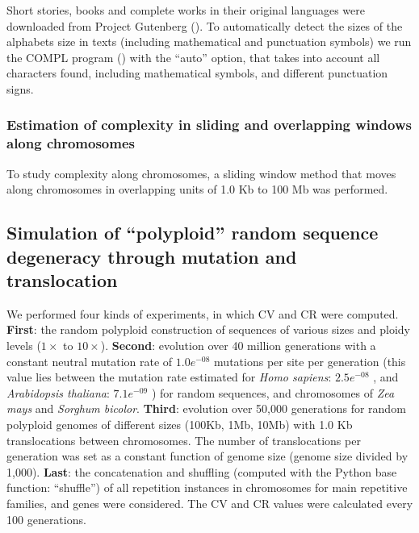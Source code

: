 Short stories, books and complete works in their original languages were downloaded from Project Gutenberg (). To automatically detect the sizes of the alphabets size in texts (including mathematical and punctuation symbols) we run the COMPL program () with the ``auto'' option, that takes into account all characters found, including mathematical symbols, and different punctuation signs. 


\subsubsection{Estimation of complexity in sliding and overlapping windows along chromosomes}
\label{sec:complexity-windows}

To study complexity along chromosomes, a sliding window method that moves along chromosomes in overlapping units of 1.0 Kb to 100 Mb was performed.

\subsection{Simulation of ``polyploid'' random sequence degeneracy through mutation and translocation}
\label{sec:simulations}

We performed four kinds of experiments, in which CV and CR were computed. \textbf{First}: the random polyploid construction of sequences of various sizes and ploidy levels ($1\times$ to $10\times$). \textbf{Second}: evolution over 40 million generations with a constant neutral mutation rate of $1.0e^{-08}$ mutations per site per generation (this value lies between the mutation rate estimated for {\it Homo sapiens}: $2.5e^{-08}$ \cite{Nachman2000} , and \textit{Arabidopsis thaliana}: $7.1e^{-09}$ \cite{Ossowski2010}) for random sequences, and chromosomes of \textit{Zea mays} and \textit{Sorghum bicolor}. \textbf{Third}: evolution over 50,000 generations for random polyploid genomes of different sizes (100Kb, 1Mb, 10Mb) with 1.0 Kb translocations between chromosomes. The number of translocations per generation was set as a constant function of genome size (genome size divided by 1,000). \textbf{Last}: the concatenation and shuffling (computed with the Python base function: ``shuffle'') of all repetition instances in chromosomes for main repetitive families, and genes were considered. The CV and CR values were calculated every 100 generations. 

